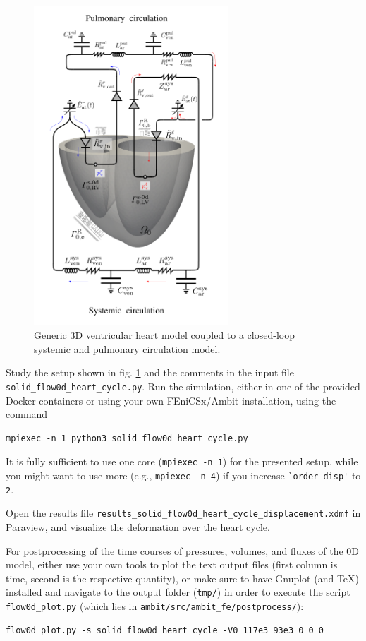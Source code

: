 \documentclass[a4paper,12pt]{report}
\begin{document}
\begin{figure}
\centering
\includegraphics[width=0.65\textwidth]{fig/heart_syspul_setup.png}
\caption{Generic 3D ventricular heart model coupled to a closed-loop systemic and pulmonary circulation model.}
\label{fig:heart_syspul_setup}
\end{figure}

Study the setup shown in fig. \ref{fig:heart_syspul_setup} and the comments in the input file \verb"solid_flow0d_heart_cycle.py". Run the simulation, either in one of the provided Docker containers or using your own FEniCSx/Ambit installation, using the command
\begin{verbatim}
mpiexec -n 1 python3 solid_flow0d_heart_cycle.py
\end{verbatim}

It is fully sufficient to use one core (\verb"mpiexec -n 1") for the presented setup, while you might want to use more (e.g., \verb"mpiexec -n 4") if you increase \verb"`order_disp'" to \verb"2".

Open the results file \verb"results_solid_flow0d_heart_cycle_displacement.xdmf" in Paraview, and visualize the deformation over the heart cycle.

For postprocessing of the time courses of pressures, volumes, and fluxes of the 0D model, either use your own tools to plot the text output files (first column is time, second is the respective quantity), or make sure to have Gnuplot (and TeX) installed and navigate to the output folder (\verb"tmp/") in order to execute the script \verb"flow0d_plot.py" (which lies in \verb"ambit/src/ambit_fe/postprocess/"):
\begin{verbatim}
flow0d_plot.py -s solid_flow0d_heart_cycle -V0 117e3 93e3 0 0 0
\end{verbatim}
\end{document}
